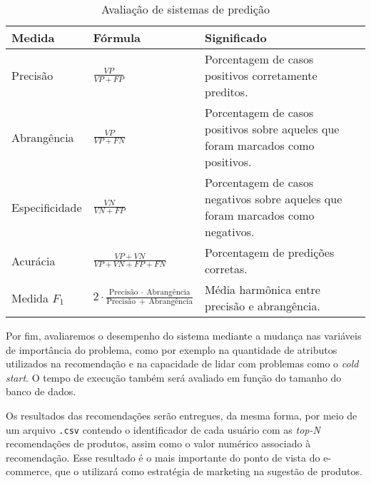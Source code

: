\begin{table}[hp]
\begin{center}
    \caption{Avaliação de sistemas de predição}
    \label{tab:avaliacao-predicao}
    \begin{tabular}{  | >{\arraybackslash} m{3cm} | >{\centering\arraybackslash} m{4cm} | >{\arraybackslash} m{6cm} | }
    \hline
    \textbf{Medida} & \textbf{Fórmula} & \textbf{Significado} \\ \hline
    Precisão &  $\frac{VP}{VP+FP}$ & Porcentagem de casos positivos corretamente preditos. \\ \hline                            
    Abrangência & $\frac{VP}{VP+FN}$ & Porcentagem de casos positivos sobre aqueles que foram marcados como positivos. \\ \hline
    Especificidade & $\frac{VN}{VN+FP}$ &  Porcentagem de casos negativos sobre aqueles que foram marcados como negativos. \\ \hline
    Acurácia & $\frac{VP+VN}{VP+VN+FP+FN}$ & Porcentagem de predições corretas. \\ \hline
    Medida $F_1$ &  $2 \cdot \frac{\mathrm{Precisão}~\cdot~\mathrm{Abrangência}}{\mathrm{Precisão}~+~\mathrm{Abrangência}}$ & Média harmônica entre precisão e abrangência. \\ \hline
    \end{tabular}
\end{center}
\end{table}

Por fim, avaliaremos o desempenho do sistema mediante a mudança nas variáveis de importância do problema, como por exemplo na quantidade de atributos utilizados na recomendação e na capacidade de lidar com problemas como o \textit{cold start}. O tempo de execução também será avaliado em função do tamanho do banco de dados.

Os resultados das recomendações serão entregues, da mesma forma, por meio de um arquivo \texttt{.csv} contendo o identificador de cada usuário com as \textit{top-N} recomendações de produtos, assim como o valor numérico associado à recomendação. Esse resultado é o mais importante do ponto de vista do e-commerce, que o utilizará como estratégia de marketing na sugestão de produtos.